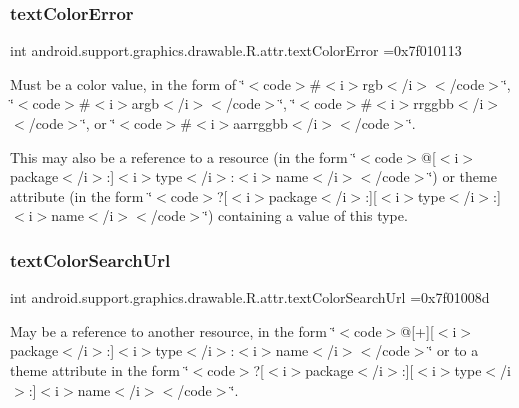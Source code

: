 \subsubsection{\texorpdfstring{text\+Color\+Error}{textColorError}}
{\footnotesize\ttfamily int android.\+support.\+graphics.\+drawable.\+R.\+attr.\+text\+Color\+Error =0x7f010113\hspace{0.3cm}{\ttfamily [static]}}

Must be a color value, in the form of \char`\"{}$<$code$>$\#$<$i$>$rgb$<$/i$>$$<$/code$>$\char`\"{}, \char`\"{}$<$code$>$\#$<$i$>$argb$<$/i$>$$<$/code$>$\char`\"{}, \char`\"{}$<$code$>$\#$<$i$>$rrggbb$<$/i$>$$<$/code$>$\char`\"{}, or \char`\"{}$<$code$>$\#$<$i$>$aarrggbb$<$/i$>$$<$/code$>$\char`\"{}. 

This may also be a reference to a resource (in the form \char`\"{}$<$code$>$@\mbox{[}$<$i$>$package$<$/i$>$\+:\mbox{]}$<$i$>$type$<$/i$>$\+:$<$i$>$name$<$/i$>$$<$/code$>$\char`\"{}) or theme attribute (in the form \char`\"{}$<$code$>$?\mbox{[}$<$i$>$package$<$/i$>$\+:\mbox{]}\mbox{[}$<$i$>$type$<$/i$>$\+:\mbox{]}$<$i$>$name$<$/i$>$$<$/code$>$\char`\"{}) containing a value of this type. \mbox{\label{classandroid_1_1support_1_1graphics_1_1drawable_1_1R_1_1attr_a71b7c58efd9ce4bec525d10f2cc4e3df}} 
\subsubsection{\texorpdfstring{text\+Color\+Search\+Url}{textColorSearchUrl}}
{\footnotesize\ttfamily int android.\+support.\+graphics.\+drawable.\+R.\+attr.\+text\+Color\+Search\+Url =0x7f01008d\hspace{0.3cm}{\ttfamily [static]}}

May be a reference to another resource, in the form \char`\"{}$<$code$>$@\mbox{[}+\mbox{]}\mbox{[}$<$i$>$package$<$/i$>$\+:\mbox{]}$<$i$>$type$<$/i$>$\+:$<$i$>$name$<$/i$>$$<$/code$>$\char`\"{} or to a theme attribute in the form \char`\"{}$<$code$>$?\mbox{[}$<$i$>$package$<$/i$>$\+:\mbox{]}\mbox{[}$<$i$>$type$<$/i$>$\+:\mbox{]}$<$i$>$name$<$/i$>$$<$/code$>$\char`\"{}. 

